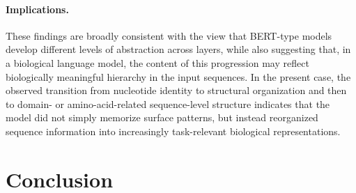 \documentclass[a4paper,11pt,draft]{jsarticle}
\begin{document}
\paragraph{Implications.}
These findings are broadly consistent with the view that BERT-type models develop different levels of abstraction across layers, while also suggesting that, in a biological language model, the content of this progression may reflect biologically meaningful hierarchy in the input sequences. In the present case, the observed transition from nucleotide identity to structural organization and then to domain- or amino-acid-related sequence-level structure indicates that the model did not simply memorize surface patterns, but instead reorganized sequence information into increasingly task-relevant biological representations. 
\section{Conclusion}
\clearpage



\end{document}
